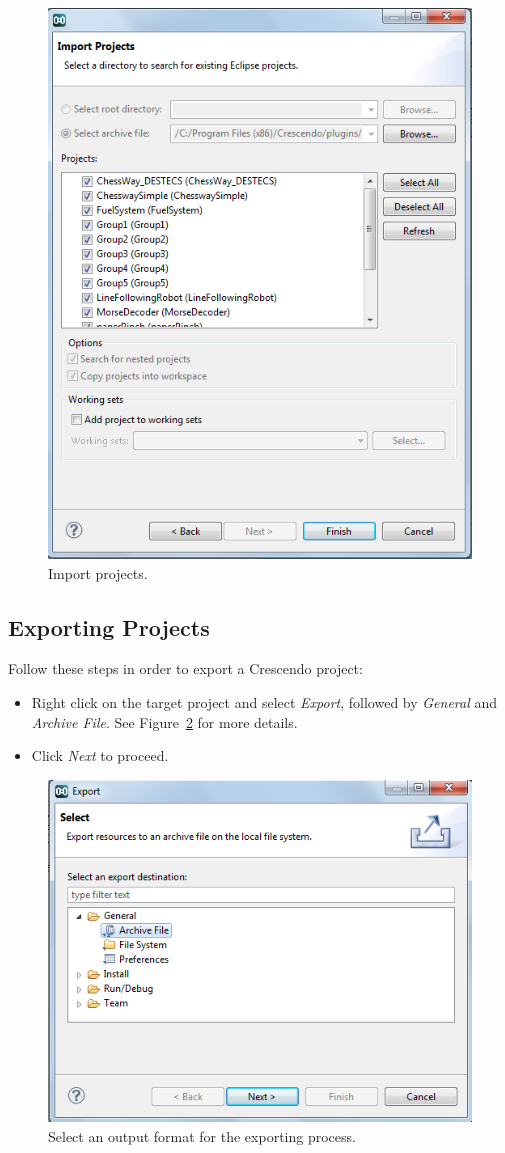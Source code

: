 \documentclass{crescendorepchap}
\begin{document}
\begin{figure}[htbp]
\centering
\includegraphics[width=.6\textwidth]{images/DestecsImportProject.png}
\caption{Import projects.\label{fig:importproject}}
\end{figure}


\subsection{Exporting Projects}

Follow these steps in order to export a Crescendo project:

\begin{itemize}
\item
  Right click on the target project and select \emph{Export}, followed
  by \emph{General} and \emph{Archive File}. See Figure~\ref{fig:export}
  for more details.
\item
  Click \emph{Next} to proceed.
\end{itemize}


\begin{figure}[htbp]
\centering
\includegraphics[width=.6\textwidth]{images/DestecsExportDialog.png}
\caption{Select an output format for the exporting process.\label{fig:export}}
\end{figure}
\end{document}
